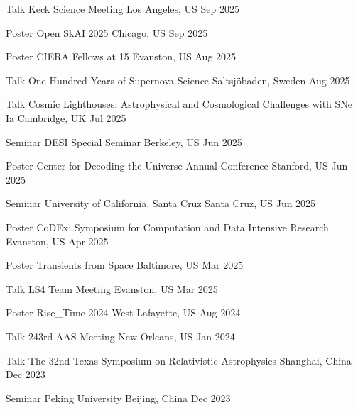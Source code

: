 


\begin{cventries}
	
	\cvsimsimpentry
	{Talk}
	{Keck Science Meeting}
	{Los Angeles, US}
	{Sep 2025}

	\cvsimsimpentry
	{Poster}
	{Open SkAI 2025}
	{Chicago, US}
	{Sep 2025}

	\cvsimsimpentry
	{Poster}
	{CIERA Fellows at 15}
	{Evanston, US}
	{Aug 2025}

	\cvsimsimpentry
	{Talk}
	{One Hundred Years of Supernova Science}
	{Saltsjöbaden, Sweden}
	{Aug 2025}

	\cvsimsimpentry
	{Talk}
	{Cosmic Lighthouses: Astrophysical and Cosmological Challenges with SNe Ia}
	{Cambridge, UK}
	{Jul 2025}

	\cvsimsimpentry
	{Seminar}
	{DESI Special Seminar}
	{Berkeley, US}
	{Jun 2025}

	\cvsimsimpentry
	{Poster}
	{Center for Decoding the Universe Annual Conference}
	{Stanford, US}
	{Jun 2025}

	\cvsimsimpentry
	{Seminar}
	{University of California, Santa Cruz}
	{Santa Cruz, US}
	{Jun 2025}

	\cvsimsimpentry
	{Poster}
	{CoDEx: Symposium for Computation and Data Intensive Research}
	{Evanston, US}
	{Apr 2025}

	\cvsimsimpentry
	{Poster}
	{Transients from Space}
	{Baltimore, US}
	{Mar 2025}

	\cvsimsimpentry
	{Talk}
	{LS4 Team Meeting}
	{Evanston, US}
	{Mar 2025}

	\cvsimsimpentry
	{Poster}
	{Rise\_Time 2024}
	{West Lafayette, US}
	{Aug 2024}

	\cvsimsimpentry
	{Talk}
	{243rd AAS Meeting}
	{New Orleans, US}
	{Jan 2024}

	\cvsimsimpentry
	{Talk}
	{The 32nd Texas Symposium on Relativistic Astrophysics}
	{Shanghai, China}
	{Dec 2023}

	\cvsimsimpentry
	{Seminar}
	{Peking University}
	{Beijing, China}
	{Dec 2023}


\end{cventries}
